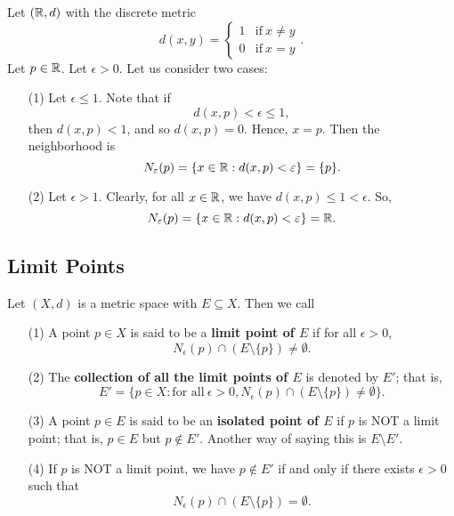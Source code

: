 \documentclass[a4paper]{report}
\begin{document}
\begin{eg}
   Let \( (\mathbb{R}, d) \) with the discrete metric
   \[  d(x,y) = 
   \begin{cases}
       1 &\text{if} \ x \neq y \\
       0 &\text{if} \ x =  y 
   \end{cases}.  \]
   Let \( p \in \mathbb{R}  \). Let \( \epsilon > 0  \). Let us consider two cases:
   \begin{enumerate}
       \item[(1)] Let \( \epsilon \leq 1  \). Note that if
           \[  d(x,p) < \epsilon \leq 1, \]
           then \( d(x,p) < 1  \), and so \( d(x,p) = 0  \). Hence, \( x = p  \). Then the neighborhood is 
           \[  {N}_{\varepsilon}(p) = \{ x \in \mathbb{R} : d(x,p) < \varepsilon \}  = \{ p \}. \]
        \item[(2)] Let \( \epsilon > 1  \). Clearly, for all \( x \in \mathbb{R}  \), we have \( d(x,p) \leq 1 < \epsilon. \)
            So,
            \[  {N}_{\varepsilon}(p) = \{ x \in \mathbb{R} : d(x,p) < \varepsilon \}  = \mathbb{R}.  \]
   \end{enumerate}
\end{eg}

\subsection{Limit Points}

\begin{definition}
    Let \( (X,d) \) is a metric space with \( E \subseteq X  \). Then we call
   \begin{enumerate}
       \item[(1)] A point \( p \in X  \) is said to be a \textbf{limit point of \( E  \)} if for all \( \epsilon > 0  \), 
           \[  {N}_{\epsilon}(p) \cap (E \setminus  \{ p \} ) \neq \emptyset. \]
       \item[(2)] The \textbf{collection of all the limit points of \( E  \)} is denoted by \( E' \); that is,
           \[  E' = \{ p \in X : \text{for all} \ \epsilon > 0, {N}_{\epsilon}(p) \cap (E \setminus  \{ p \} ) \neq \emptyset \}.  \]
        \item[(3)] A point \( p \in E  \) is said to be an \textbf{isolated point of \( E  \)} if \( p  \) is NOT a limit point; that is,  \( p \in E  \) but \( p \notin E' \). Another way of saying this is \( E \setminus  E' \). 
        \item[(4)] If \( p  \) is NOT a limit point, we have \( p \notin E' \) if and only if there exists \( \epsilon > 0  \) such that 
    \[  {N}_{\epsilon}(p) \cap (E \setminus  \{ p \} ) = \emptyset. \]
\end{enumerate} 
\end{definition}
\end{document}
